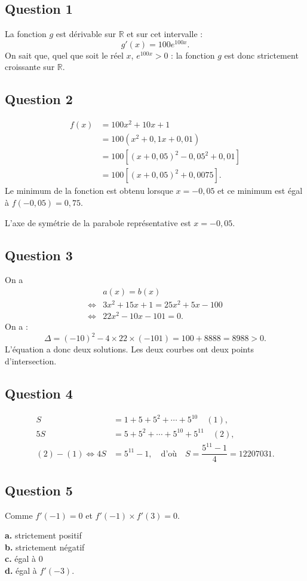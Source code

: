 \subsection*{Question 1}
	La fonction \( g \) est dérivable sur \( \mathbb{R} \) et sur cet intervalle :
	\[
	g'(x) = 100 e^{100x}.
	\]
	On sait que, quel que soit le réel \( x \), \( e^{100x} > 0 \) : la fonction \( g \) est donc strictement croissante sur \( \mathbb{R} \).
	
	\subsection*{Question 2}
\begin{align*}
	f(x) &= 100x^2 + 10x + 1\\
	& = 100 \left( x^2 + 0,1x + 0,01 \right)\\
	&= 100 \left[ (x + 0,05)^2 - 0,05^2 + 0,01 \right]\\
	& = 100 \left[ (x + 0,05)^2 + 0,0075 \right].
\end{align*}
	Le minimum de la fonction est obtenu lorsque \( x = -0,05 \) et ce minimum est égal à \( f(-0,05) = 0,75 \).
	
	L'axe de symétrie de la parabole représentative est \( x = -0,05 \).
	
	\subsection*{Question 3}
	On a 
\begin{align*}
	&a(x) = b(x)\\
	 \iff &3x^2 + 15x + 1 = 25x^2 + 5x - 100\\
	  \iff&22x^2 - 10x - 101 = 0.
\end{align*}
	On a :
	\[
	\Delta = (-10)^2 - 4 \times 22 \times (-101) = 100 + 8888 = 8988 > 0.
	\]
	L'équation a donc deux solutions. Les deux courbes ont deux points d'intersection.
	
	\subsection*{Question 4}
	\begin{align*}
		S &= 1 + 5 + 5^2 + \cdots + 5^{10} \quad (1), \\
		5S &= 5 + 5^2 + \cdots + 5^{10} + 5^{11} \quad (2), \\
		(2) - (1) \iff 4S &= 5^{11} - 1, \quad \text{d'où} \quad S = \dfrac{5^{11} - 1}{4} = 12207031.
	\end{align*}
	
	\subsection*{Question 5}
	Comme \( f'(-1) = 0 \) et \( f'(-1) \times f'(3) = 0 \).
	
	\medskip
	\textbf{a.} strictement positif \\
	\textbf{b.} strictement négatif \\
	\textbf{c.} égal à 0 \\
	\textbf{d.} égal à \( f'(-3) \).
